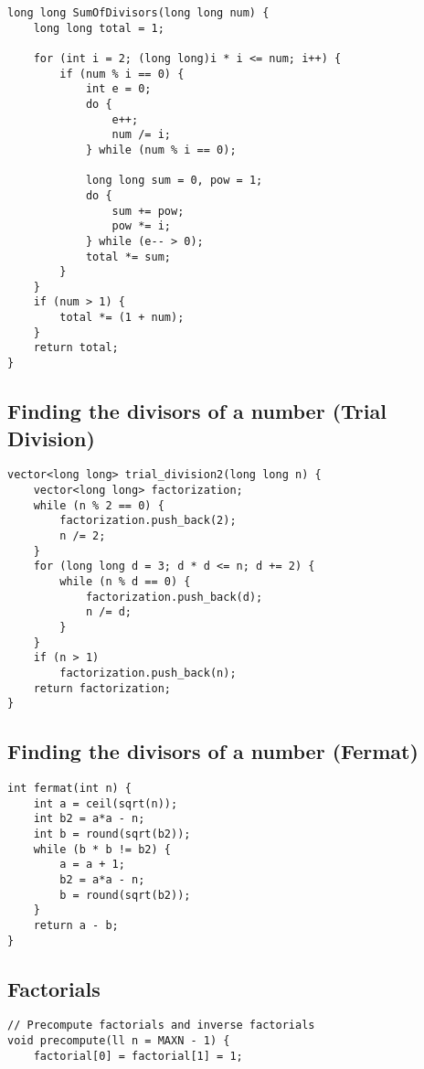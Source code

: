 \documentclass[10pt]{article}
\begin{document}
\begin{multicols*}{2}
\begin{lstlisting}
long long SumOfDivisors(long long num) {
    long long total = 1;

    for (int i = 2; (long long)i * i <= num; i++) {
        if (num % i == 0) {
            int e = 0;
            do {
                e++;
                num /= i;
            } while (num % i == 0);

            long long sum = 0, pow = 1;
            do {
                sum += pow;
                pow *= i;
            } while (e-- > 0);
            total *= sum;
        }
    }
    if (num > 1) {
        total *= (1 + num);
    }
    return total;
}
\end{lstlisting}

\subsection{Finding the divisors of a number (Trial Division)}

\begin{lstlisting}[style=compactcpp]
vector<long long> trial_division2(long long n) {
    vector<long long> factorization;
    while (n % 2 == 0) {
        factorization.push_back(2);
        n /= 2;
    }
    for (long long d = 3; d * d <= n; d += 2) {
        while (n % d == 0) {
            factorization.push_back(d);
            n /= d;
        }
    }
    if (n > 1)
        factorization.push_back(n);
    return factorization;
}
\end{lstlisting}

\subsection{Finding the divisors of a number (Fermat)}
\begin{lstlisting}[style=compactcpp]
int fermat(int n) {
    int a = ceil(sqrt(n));
    int b2 = a*a - n;
    int b = round(sqrt(b2));
    while (b * b != b2) {
        a = a + 1;
        b2 = a*a - n;
        b = round(sqrt(b2));
    }
    return a - b;
}
\end{lstlisting}


\subsection{Factorials}

\begin{lstlisting}
// Precompute factorials and inverse factorials
void precompute(ll n = MAXN - 1) {
    factorial[0] = factorial[1] = 1;
    

\end{lstlisting}
\end{multicols*}
\end{document}
